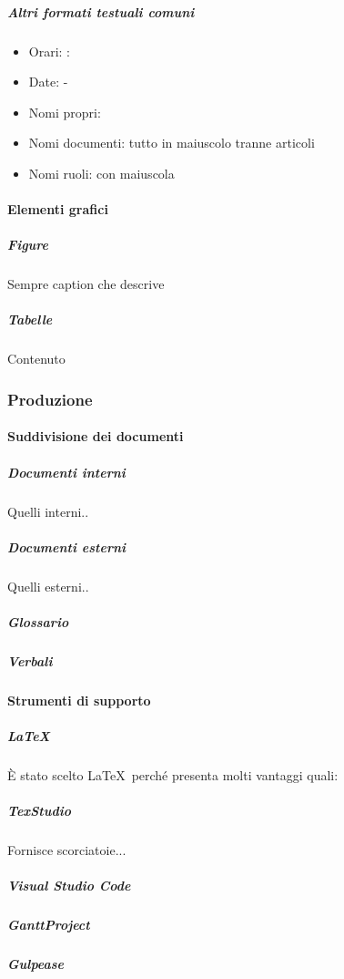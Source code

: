 			\subparagraph{Altri formati testuali comuni} %
			\begin{itemize}
				\item Orari:  :
				\item Date:		-
				\item Nomi propri:
				\item Nomi documenti: tutto in maiuscolo tranne articoli
				\item Nomi ruoli: con maiuscola
			\end{itemize}



			\paragraph{Elementi grafici}

			\subparagraph{Figure}
			 Sempre caption che descrive 

			\subparagraph{Tabelle}
			Contenuto



		\subsubsection{Produzione}

			\paragraph{Suddivisione dei documenti}

			\subparagraph{Documenti interni}
			Quelli interni..

			\subparagraph{Documenti esterni}
			Quelli esterni..

			\subparagraph{Glossario}

			\subparagraph{Verbali}



			\paragraph{Strumenti di supporto}

			\subparagraph{\LaTeX} \label{LaTeX}
			È stato scelto \LaTeX \ perché presenta molti vantaggi quali:

			\subparagraph{TexStudio}
			Fornisce scorciatoie...
			
			\subparagraph{Visual Studio Code}
			

			\subparagraph{GanttProject}
			
			
			\subparagraph{Gulpease}
			
